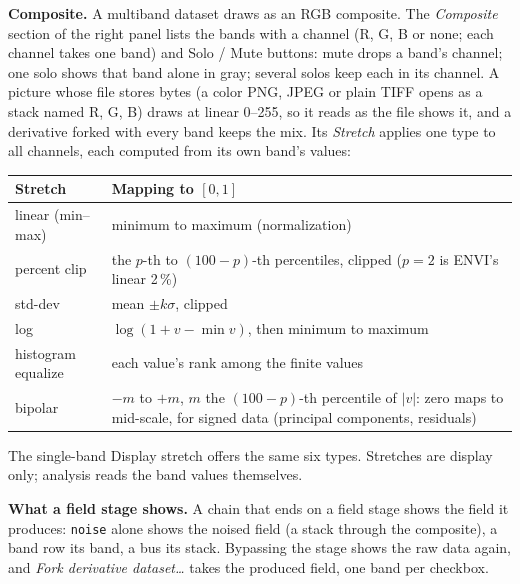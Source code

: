 \documentclass[10pt]{article}
\newcommand{\dev}[1]{\texttt{#1}}
\begin{document}
\textbf{Composite.} A multiband dataset draws as an RGB composite. The \emph{Composite}
section of the right panel lists the bands with a channel (R, G, B or none; each channel
takes one band) and Solo / Mute buttons: mute drops a band's channel; one solo shows that
band alone in gray; several solos keep each in its channel. A picture whose file stores
bytes (a color PNG, JPEG or plain TIFF opens as a stack named R, G, B) draws at linear
0--255, so it reads as the file shows it, and a derivative forked with every band keeps
the mix. Its \emph{Stretch} applies one type to all channels, each computed from its own
band's values:

\begin{longtable}{L M}
\toprule Stretch & Mapping to $[0,1]$ \\ \midrule
linear (min--max) & minimum to maximum (normalization) \\
percent clip & the $p$-th to $(100-p)$-th percentiles, clipped ($p=2$ is ENVI's linear 2\,\%) \\
std-dev & mean $\pm k\sigma$, clipped \\
log & $\log(1+v-\min v)$, then minimum to maximum \\
histogram equalize & each value's rank among the finite values \\
bipolar & $-m$ to $+m$, $m$ the $(100-p)$-th percentile of $|v|$: zero maps to mid-scale,
          for signed data (principal components, residuals) \\
\bottomrule
\end{longtable}

The single-band Display stretch offers the same six types. Stretches are display only;
analysis reads the band values themselves.

\textbf{What a field stage shows.} A chain that ends on a field stage shows the field it
produces: \dev{noise} alone shows the noised field (a stack through the composite), a band row
its band, a bus its stack. Bypassing the stage shows the raw data again, and \emph{Fork
derivative dataset\ldots} takes the produced field, one band per checkbox.
\end{document}
